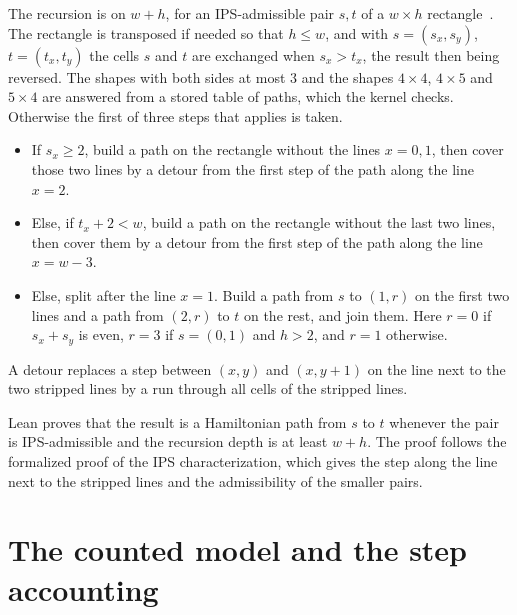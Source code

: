 \documentclass[11pt]{article}
\begin{document}
The recursion is on $w+h$, for an IPS-admissible pair $s,t$ of a $w\times h$ rectangle~\cite{ips82}.
The rectangle is transposed if needed so that $h\le w$, and with $s=(s_x,s_y)$, $t=(t_x,t_y)$ the
cells $s$ and $t$ are exchanged when $s_x>t_x$, the result then being reversed. The shapes with both
sides at most $3$ and the shapes $4\times 4$, $4\times 5$ and $5\times 4$ are answered from a stored
table of paths, which the kernel checks. Otherwise the first of three steps that applies is taken.
\begin{itemize}
\item If $s_x\ge 2$, build a path on the rectangle without the lines $x=0,1$, then cover those two
  lines by a detour from the first step of the path along the line $x=2$.
\item Else, if $t_x+2<w$, build a path on the rectangle without the last two lines, then cover
  them by a detour from the first step of the path along the line $x=w-3$.
\item Else, split after the line $x=1$. Build a path from $s$ to $(1,r)$ on the first two lines and
  a path from $(2,r)$ to $t$ on the rest, and join them. Here $r=0$ if $s_x+s_y$ is even, $r=3$ if
  $s=(0,1)$ and $h>2$, and $r=1$ otherwise.
\end{itemize}
A detour replaces a step between $(x,y)$ and $(x,y+1)$ on the line next to the two stripped lines
by a run through all cells of the stripped lines.

Lean proves that the result is a Hamiltonian path from $s$ to $t$ whenever the pair is
IPS-admissible and the recursion depth is at least $w+h$. The proof follows the formalized proof
of the IPS characterization, which gives the step along the line next to the stripped lines and the
admissibility of the smaller pairs.

\section{The counted model and the step accounting}\label{sec:steps}
\end{document}
